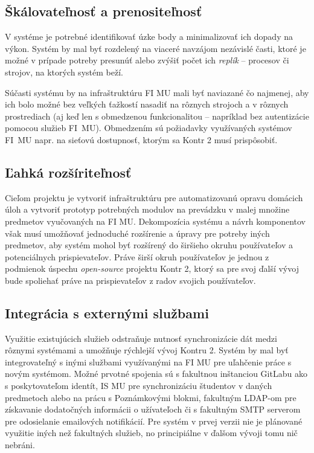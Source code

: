 \documentclass[
  digital, %
  twoside, %
  table,   %
  lof,     %
  lot,     %
]{fithesis3}
\begin{document}
\subsection{Škálovateľnosť a prenositeľnosť}

V systéme je potrebné identifikovať úzke body a minimalizovať ich dopady na výkon. Systém by mal byť rozdelený na viaceré navzájom nezávislé časti, ktoré je možné v prípade potreby presunúť alebo zvýšiť počet ich \emph{replík} -- procesov či strojov, na ktorých systém beží. 

Súčasti systému by na infraštruktúru FI MU mali byť naviazané čo najmenej, aby ich bolo možné bez veľkých ťažkostí nasadiť na rôznych strojoch a v rôznych prostrediach (aj keď len s obmedzenou funkcionalitou -- napríklad bez autentizácie pomocou služieb FI~MU). Obmedzením sú požiadavky využívaných systémov FI~MU napr. na sieťovú dostupnosť, ktorým sa Kontr 2 musí prispôsobiť.

\subsection{Ľahká rozšíriteľnosť}

Cieľom projektu je vytvoriť infraštruktúru pre automatizovanú opravu domácich úloh a vytvoriť prototyp potrebných modulov na prevádzku v malej množine predmetov vyučovaných na FI MU. Dekompozícia systému a návrh komponentov však musí umožňovať jednoduché rozšírenie a úpravy pre potreby iných predmetov, aby systém mohol byť rozšírený do širšieho okruhu používateľov a potenciálnych prispievateľov. Práve širší okruh používateľov je jednou z podmienok úspechu \emph{open-source} projektu Kontr 2, ktorý sa pre svoj ďalší vývoj bude spoliehať práve na prispievateľov z radov svojich používateľov.

\subsection{Integrácia s externými službami}
Využitie existujúcich služieb odstraňuje nutnosť synchronizácie dát medzi rôznymi systémami a umožňuje rýchlejší vývoj Kontru 2. Systém by mal byť integrovateľný s inými službami využívanými na FI MU pre uľahčenie práce s novým systémom. Možné prvotné spojenia sú s fakultnou inštanciou GitLabu ako s poskytovateľom identít, IS MU pre synchronizáciu študentov v daných predmetoch alebo na prácu s Poznámkovými blokmi, fakultným LDAP-om pre získavanie dodatočných informácii o užívateľoch či s fakultným SMTP serverom pre odosielanie emailových notifikácií. Pre systém v prvej verzii nie je plánované využitie iných než fakultných služieb, no principiálne v ďalšom vývoji tomu nič nebráni.
\end{document}
